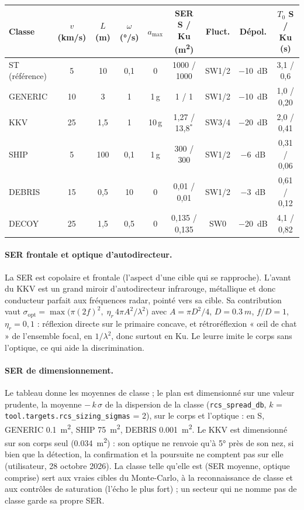 \documentclass[11pt,a4paper]{article}
\newcommand{\code}[1]{\texttt{\small #1}}
\begin{document}
\begin{center}
{\small\setlength{\tabcolsep}{4pt}\begin{tabular}{@{}lcccccccc@{}}
\toprule
Classe & $v$ (km/s) & $L$ (m) & $\omega$ (\si{\degree/s}) & $a_{\max}$ & SER S / Ku (\si{m^2}) & Fluct. & Dépol. & $T_0$ S / Ku (s)\\
\midrule
ST (référence) & 5 & 10 & 0,1 & 0 & \num{1000} / \num{1000} & SW1/2 & \SI{-10}{dB} & 3,1 / 0,6\\
GENERIC & 10 & 3 & 1 & 1\,g & 1 / 1 & SW1/2 & \SI{-10}{dB} & 1,0 / 0,20\\
KKV & 25 & 1,5 & 1 & 10\,g & 1,27 / 13,8$^\ast$ & SW3/4 & \SI{-20}{dB} & 2,0 / 0,41\\
SHIP & 5 & 100 & 0,1 & 1\,g & 300 / 300 & SW1/2 & \SI{-6}{dB} & 0,31 / 0,06\\
DEBRIS & 15 & 0,5 & 10 & 0 & 0,01 / 0,01 & SW1/2 & \SI{-3}{dB} & 0,61 / 0,12\\
DECOY & 25 & 1,5 & 0,5 & 0 & 0,135 / 0,135 & SW0 & \SI{-20}{dB} & 4,1 / 0,82\\
\bottomrule
\end{tabular}}

\end{center}

\paragraph{SER frontale et optique d'autodirecteur.} La SER est copolaire et frontale (l'aspect d'une cible qui se
rapproche). L'avant du KKV est un grand miroir d'autodirecteur infrarouge, métallique et donc conducteur parfait aux
fréquences radar, pointé vers sa cible. Sa contribution vaut
$\sigma_{\mathrm{opt}} = \max\bigl(\pi(2f)^2,\;\eta_r\,4\pi A^2/\lambda^2\bigr)$ avec $A = \pi D^2/4$,
$D = \SI{0.3}{m}$, $f/D = 1$, $\eta_r = 0,1$ : réflexion directe sur le primaire concave, et rétroréflexion « \oe{}il de
chat » de l'ensemble focal, en $1/\lambda^2$, donc surtout en Ku. Le leurre imite le corps sans l'optique, ce qui aide
la discrimination.

\paragraph{SER de dimensionnement.} Le tableau donne les moyennes de classe ; le plan est dimensionné sur une valeur
prudente, la moyenne $-\,k\,\sigma$ de la dispersion de la classe (\code{rcs\_spread\_db}, $k$ =
\code{tool.targets.rcs\_sizing\_sigmas} = 2), sur le corps et l'optique : en S, GENERIC \SI{0.1}{m^2}, SHIP
\SI{75}{m^2}, DEBRIS \SI{0.001}{m^2}. Le KKV est dimensionné sur son corps seul (\SI{0.034}{m^2}) : son optique ne
renvoie qu'à \ang{5} près de son nez, si bien que la détection, la confirmation et la poursuite ne comptent pas sur
elle (utilisateur, 28 octobre 2026). La classe telle qu'elle est (SER moyenne, optique comprise) sert aux vraies cibles
du Monte-Carlo, à la reconnaissance de classe et aux contrôles de saturation (l'écho le plus fort) ; un secteur qui ne
nomme pas de classe garde sa propre SER.
\end{document}
